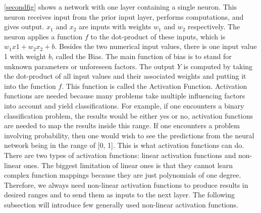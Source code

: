 \documentclass[a4paper,11pt,oneside]{book}
\begin{document}
\autoref{secondfig} shows a network with one layer containing a single neuron. This neuron receives input from the prior input layer, performs computations, and gives output. $x_1$ and $x_2$ are inputs with weights $w_1$ and $w_2$ respectively. The neuron applies a function $f$ to the dot-product of these inputs, which is $w_{1}x{1}+w_{2}x_{2}+b$.  Besides the two numerical input values, there is one input value 1 with weight $b$, called the Bias. The main function of bias is to stand for unknown parameters or unforeseen factors. The output $Y$ is computed by taking the dot-product of all input
values and their associated weights and putting it into the function $f$. This function is called the Activation Function.\newline\newline
Activation functions are needed because many problems take multiple influencing factors into account and yield classifications. For example, if one encounters a binary classification problem, the results would
be either yes or no, activation functions are needed to map the results
inside this range. If one encounters a problem involving probability, then
one would wish to see the predictions from the neural network being in
the range of [0, 1]. This is what activation functions can do.\newline\newline
There are two types of activation functions: linear activation
functions and non-linear ones. The biggest limitation of linear ones is
that they cannot learn complex function mappings because they are
just polynomials of one degree. Therefore, we always need non-linear
activation functions to produce results in desired ranges and to send
them as inputs to the next layer. The following subsection will introduce
few generally used non-linear activation functions.
\end{document}
